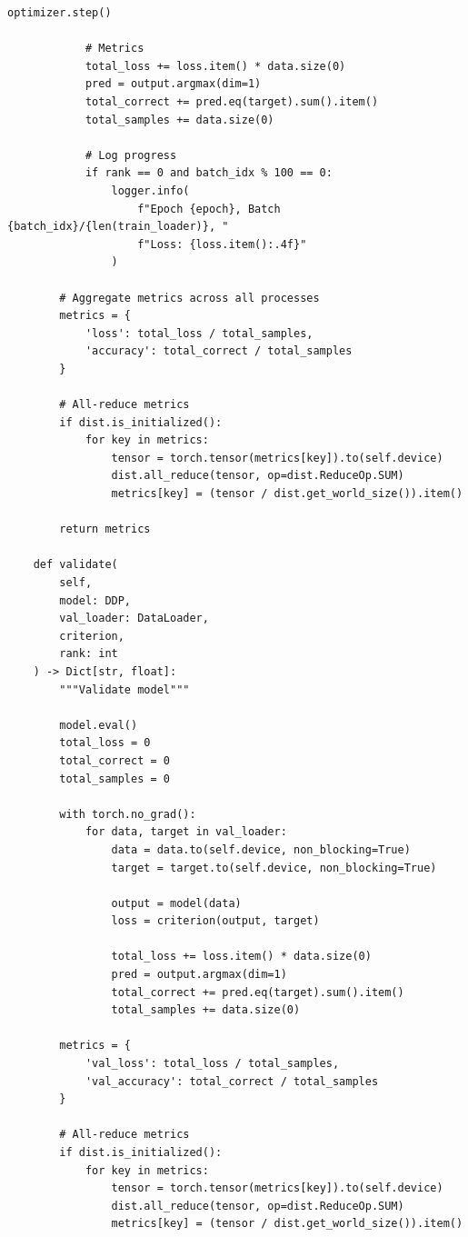 \begin{lstlisting}[style=python, caption=Complete PyTorch Distributed Training Example]
            optimizer.step()

            # Metrics
            total_loss += loss.item() * data.size(0)
            pred = output.argmax(dim=1)
            total_correct += pred.eq(target).sum().item()
            total_samples += data.size(0)

            # Log progress
            if rank == 0 and batch_idx % 100 == 0:
                logger.info(
                    f"Epoch {epoch}, Batch {batch_idx}/{len(train_loader)}, "
                    f"Loss: {loss.item():.4f}"
                )

        # Aggregate metrics across all processes
        metrics = {
            'loss': total_loss / total_samples,
            'accuracy': total_correct / total_samples
        }

        # All-reduce metrics
        if dist.is_initialized():
            for key in metrics:
                tensor = torch.tensor(metrics[key]).to(self.device)
                dist.all_reduce(tensor, op=dist.ReduceOp.SUM)
                metrics[key] = (tensor / dist.get_world_size()).item()

        return metrics

    def validate(
        self,
        model: DDP,
        val_loader: DataLoader,
        criterion,
        rank: int
    ) -> Dict[str, float]:
        """Validate model"""

        model.eval()
        total_loss = 0
        total_correct = 0
        total_samples = 0

        with torch.no_grad():
            for data, target in val_loader:
                data = data.to(self.device, non_blocking=True)
                target = target.to(self.device, non_blocking=True)

                output = model(data)
                loss = criterion(output, target)

                total_loss += loss.item() * data.size(0)
                pred = output.argmax(dim=1)
                total_correct += pred.eq(target).sum().item()
                total_samples += data.size(0)

        metrics = {
            'val_loss': total_loss / total_samples,
            'val_accuracy': total_correct / total_samples
        }

        # All-reduce metrics
        if dist.is_initialized():
            for key in metrics:
                tensor = torch.tensor(metrics[key]).to(self.device)
                dist.all_reduce(tensor, op=dist.ReduceOp.SUM)
                metrics[key] = (tensor / dist.get_world_size()).item()


\end{lstlisting}
